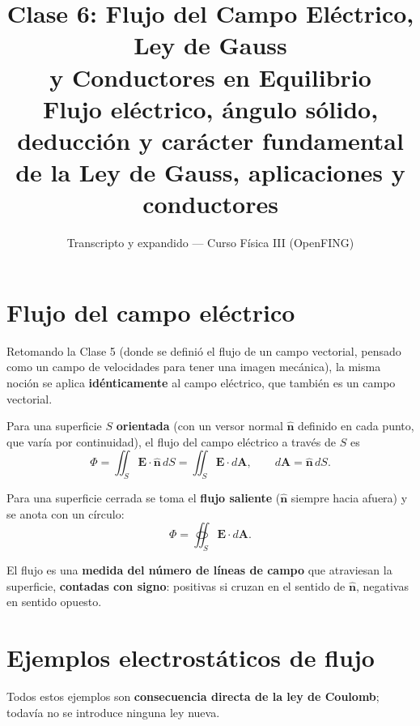 \documentclass[12pt,a4paper]{article}
\title{\textbf{Clase 6: Flujo del Campo Eléctrico, Ley de Gauss \\
        y Conductores en Equilibrio}\\[0.3em]
        \large{Flujo eléctrico, ángulo sólido, deducción y carácter
              fundamental de la Ley de Gauss, aplicaciones y conductores}}
\author{Transcripto y expandido --- Curso Física III (OpenFING)}
\date{}
\begin{document}
\maketitle
\thispagestyle{empty}
\newpage

\tableofcontents
\newpage

\section{Flujo del campo eléctrico}

Retomando la Clase 5 (donde se definió el flujo de un campo vectorial,
pensado como un campo de velocidades para tener una imagen mecánica),
la misma noción se aplica \textbf{idénticamente} al campo eléctrico,
que también es un campo vectorial.

Para una superficie $S$ \textbf{orientada} (con un versor normal
$\hat{\mathbf{n}}$ definido en cada punto, que varía por continuidad),
el flujo del campo eléctrico a través de $S$ es
\[
\Phi = \iint_S \mathbf{E} \cdot \hat{\mathbf{n}} \, dS
     = \iint_S \mathbf{E} \cdot d\mathbf{A},
\qquad d\mathbf{A} = \hat{\mathbf{n}}\, dS .
\]

\begin{keybox}
  Para una superficie cerrada se toma el \textbf{flujo saliente}
  ($\hat{\mathbf{n}}$ siempre hacia afuera) y se anota con un círculo:
  \[
  \Phi = \oiint_S \mathbf{E} \cdot d\mathbf{A}.
  \]
\end{keybox}

\begin{notebox}[Interpretación]
  El flujo es una \textbf{medida del número de líneas de campo} que
  atraviesan la superficie, \textbf{contadas con signo}: positivas si
  cruzan en el sentido de $\hat{\mathbf{n}}$, negativas en sentido
  opuesto.
\end{notebox}

\section{Ejemplos electrostáticos de flujo}

Todos estos ejemplos son \textbf{consecuencia directa de la ley de
Coulomb}; todavía no se introduce ninguna ley nueva.
\end{document}
